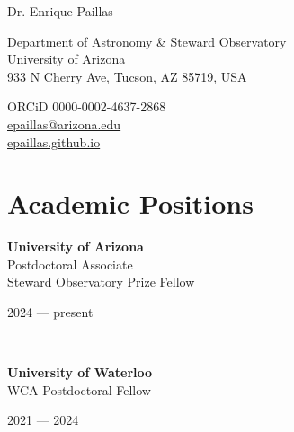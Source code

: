 \documentclass[12pt, a4paper]{article} %
\begin{document}

{\LARGE Dr. Enrique Paillas}\\[0.2cm] %
\begin{minipage}[t]{0.63\textwidth}
Department of Astronomy \& Steward Observatory\\
University of Arizona\\
933 N Cherry Ave, Tucson, AZ 85719, USA\\
\end{minipage}
\begin{minipage}[t]{0.37\textwidth}
ORCiD 0000-0002-4637-2868\\
\href{mailto:epaillas@arizona.edu}{epaillas@arizona.edu}\\
\url{epaillas.github.io}\\
\end{minipage}

\hrulefill


\section*{Academic Positions}


\begin{minipage}[t]{0.6\textwidth}
\begin{flushleft}%
  \setlength{\leftskip}{0.2cm}%
\textbf{University of Arizona}\\
Postdoctoral Associate\\
Steward Observatory Prize Fellow\\
\end{flushleft}
\end{minipage}
\begin{minipage}[t]{0.4\textwidth}
\hfill 2024 --- present
\end{minipage}\\


\begin{minipage}[t]{0.6\textwidth}
\begin{flushleft}%
  \setlength{\leftskip}{0.2cm}%
\textbf{University of Waterloo}\\
WCA Postdoctoral Fellow\\
 
\end{flushleft}
\end{minipage}
\begin{minipage}[t]{0.4\textwidth}
\hfill 2021 --- 2024
\end{minipage}\\
\end{document}
